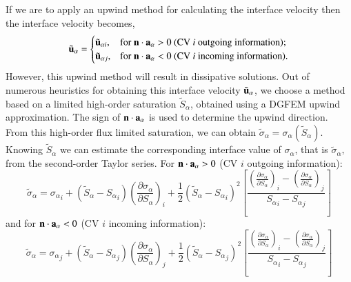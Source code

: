 \documentclass[preprint,authoryear,12pt]{elsarticle}
\begin{document}
If we are to apply an upwind method for calculating the interface velocity then the interface velocity becomes, %
\begin{displaymath}
{\tilde{\bf u}}_{\alpha} =
\begin{cases}
\tilde{\bf u}_{\alpha i}, & \text{for } {\bf n}\cdot{\bf a}_{\alpha}>0 \text{ (CV {\it i} outgoing information);} \\
\tilde{\bf u}_{\alpha j}, & \text{for } {\bf n}\cdot{\bf a}_{\alpha}<0 \text{ (CV {\it i} incoming information).} 
\end{cases}
\end{displaymath}
However, this upwind method will result in dissipative solutions. Out of numerous heuristics for obtaining this interface velocity ${\tilde{\bf u}}_\alpha$, we choose a method based on a limited high-order saturation $\tilde S_\alpha$, obtained using a DGFEM upwind approximation. The sign of ${\bf n}\cdot {\bf a}_\alpha$ is used to determine the upwind direction. From this high-order flux limited saturation, we can obtain $\tilde{\sigma}_{\alpha} = \sigma_{\alpha}\left(\tilde{S}_{\alpha}\right)$. Knowing $\tilde S_\alpha$ we can estimate the corresponding interface value of $\sigma_\alpha$, that is $\tilde\sigma_\alpha,$ from the second-order Taylor series. For ${\bf n}\cdot {\bf a}_\alpha>0$ (CV $i$ outgoing information):
\begin{equation}
  \tilde\sigma_\alpha = {\sigma_\alpha}_i + \left(\tilde S_\alpha - {S_\alpha}_i\right) \left(\frac{\partial\sigma_\alpha}{\partial S_\alpha}\right)_i + \frac{1}{2}  \left(\tilde S_\alpha - {S_\alpha}_i\right)^2 \left[ \frac{\left(\frac{\partial\sigma_\alpha}{\partial S_\alpha}\right)_i - \left(\frac{\partial\sigma_\alpha}{\partial S_\alpha}\right)_j } {{S_\alpha}_i -  {S_\alpha}_j} \right]
  \label{sigma-out}
\end{equation} 
and for ${\bf n}\cdot {\bf a}_\alpha<0$ (CV $i$ incoming information):
\begin{equation}
  \tilde\sigma_\alpha = {\sigma_\alpha}_j + \left(\tilde S_\alpha - {S_\alpha}_j\right) \left(\frac{\partial\sigma_\alpha}{\partial S_\alpha}\right)_j +\frac{1}{2} \left(\tilde S_\alpha - {S_\alpha}_j\right)^2 \left[ \frac{\left(\frac{\partial\sigma_\alpha}{\partial S_\alpha}\right)_i - \left(\frac{\partial\sigma_\alpha}{\partial S_\alpha}\right)_j } {{S_\alpha}_i - {S_\alpha}_j} \right]
  \label{sigma-in}
\end{equation} 
\end{document}
